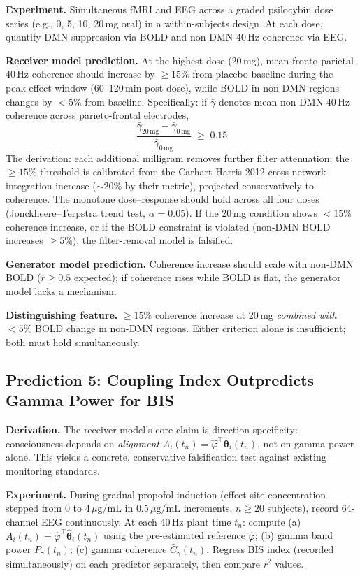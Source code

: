 \documentclass[12pt]{article}
\begin{document}
\textbf{Experiment.} Simultaneous fMRI and EEG across a graded psilocybin dose series (e.g., 0, 5, 10, 20\,mg oral) in a within-subjects design. At each dose, quantify DMN suppression via BOLD and non-DMN 40\,Hz coherence via EEG.

\textbf{Receiver model prediction.} At the highest dose (20\,mg), mean fronto-parietal 40\,Hz coherence should increase by $\geq 15\%$ from placebo baseline during the peak-effect window (60--120\,min post-dose), while BOLD in non-DMN regions changes by $< 5\%$ from baseline. Specifically: if $\bar{\gamma}$ denotes mean non-DMN 40\,Hz coherence across parieto-frontal electrodes,
\begin{equation}
    \frac{\bar{\gamma}_{20\,\mathrm{mg}} - \bar{\gamma}_{0\,\mathrm{mg}}}
         {\bar{\gamma}_{0\,\mathrm{mg}}} \;\geq\; 0.15
\end{equation}
The derivation: each additional milligram removes further filter attenuation; the $\geq 15\%$ threshold is calibrated from the Carhart-Harris 2012 cross-network integration increase ($\sim$20\% by their metric), projected conservatively to coherence. The monotone dose--response should hold across all four doses (Jonckheere--Terpstra trend test, $\alpha = 0.05$). If the 20\,mg condition shows $< 15\%$ coherence increase, or if the BOLD constraint is violated (non-DMN BOLD increases $\geq 5\%$), the filter-removal model is falsified.

\textbf{Generator model prediction.} Coherence increase should scale with non-DMN BOLD ($r \geq 0.5$ expected); if coherence rises while BOLD is flat, the generator model lacks a mechanism.

\textbf{Distinguishing feature.} $\geq 15\%$ coherence increase at 20\,mg \textit{combined with} $< 5\%$ BOLD change in non-DMN regions. Either criterion alone is insufficient; both must hold simultaneously.

\subsection{Prediction 5: Coupling Index Outpredicts Gamma Power for BIS}

\textbf{Derivation.} The receiver model's core claim is direction-specificity: consciousness depends on \emph{alignment} $A_i(t_n) = \hat{\varphi}^\top \hat{\boldsymbol{\theta}}_i(t_n)$, not on gamma power alone. This yields a concrete, conservative falsification test against existing monitoring standards.

\textbf{Experiment.} During gradual propofol induction (effect-site concentration stepped from 0 to $4\,\mu\mathrm{g/mL}$ in $0.5\,\mu\mathrm{g/mL}$ increments, $n \geq 20$ subjects), record 64-channel EEG continuously. At each 40\,Hz plant time $t_n$: compute (a) $A_i(t_n) = \hat{\varphi}^\top\hat{\boldsymbol{\theta}}_i(t_n)$ using the pre-estimated reference $\hat{\varphi}$; (b) gamma band power $P_\gamma(t_n)$; (c) gamma coherence $\bar{C}_\gamma(t_n)$. Regress BIS index (recorded simultaneously) on each predictor separately, then compare $r^2$ values.
\end{document}
